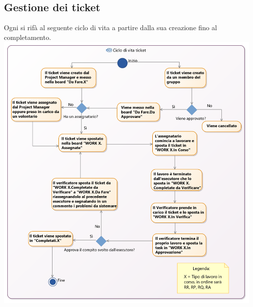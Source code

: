 \documentclass[NormeDiProgetto.tex]{subfiles}
\begin{document}
	\subsection{Gestione dei ticket}
	 Ogni  si rifà al seguente ciclo di vita a partire dalla sua creazione fino al completamento.\\
	\includegraphics[scale=0.3]{../../common/images/AsanaFlow}
	
\end{document}
